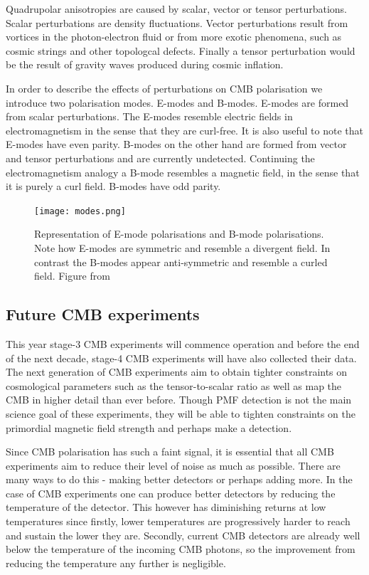 Quadrupolar anisotropies are caused by scalar, vector or tensor perturbations. Scalar perturbations are density fluctuations. Vector perturbations result from vortices in the photon-electron fluid or from more exotic phenomena, such as cosmic strings and other topologcal defects. Finally a tensor perturbation would be the result of gravity waves produced during cosmic inflation.  

In order to describe the effects of perturbations on CMB polarisation we introduce two polarisation modes. E-modes and B-modes. E-modes are formed from scalar perturbations. The E-modes resemble electric fields in electromagnetism in the sense that they are curl-free. It is also useful to note that E-modes have even parity. B-modes on the other hand are formed from vector and tensor perturbations and are currently undetected. Continuing the electromagnetism analogy a B-mode resembles a magnetic field, in the sense that it is purely a curl field. B-modes have odd parity.

\begin{figure}[h]
\centering
\texttt{[image: modes.png]}
\caption{Representation of E-mode polarisations and B-mode polarisations. Note how E-modes are symmetric and resemble a divergent field. In contrast the B-modes appear anti-symmetric and resemble a curled field. Figure from \citet{39087c288ce54d4bb9580169e1666880}}
\label{fig:modes}
\end{figure}

\subsection{Future CMB experiments}
This year stage-3 CMB experiments will commence operation and before the end of the next decade, stage-4 CMB experiments will have also collected their data. The next generation of CMB experiments aim to obtain tighter constraints on cosmological parameters such as the tensor-to-scalar ratio as well as map the CMB in higher detail than ever before. Though PMF detection is not the main science goal of these experiments, they will be able to tighten constraints on the primordial magnetic field strength and perhaps make a detection.

Since CMB polarisation has such a faint signal, it is essential that all CMB experiments aim to reduce their level of noise as much as possible. There are many ways to do this - making better detectors or perhaps adding more. In the case of CMB experiments one can produce better detectors by reducing the temperature of the detector. This however has diminishing returns at low temperatures since firstly, lower temperatures are progressively harder to reach and sustain the lower they are. Secondly, current CMB detectors are already well below the temperature of the incoming CMB photons, so the improvement from reducing the temperature any further is negligible.

